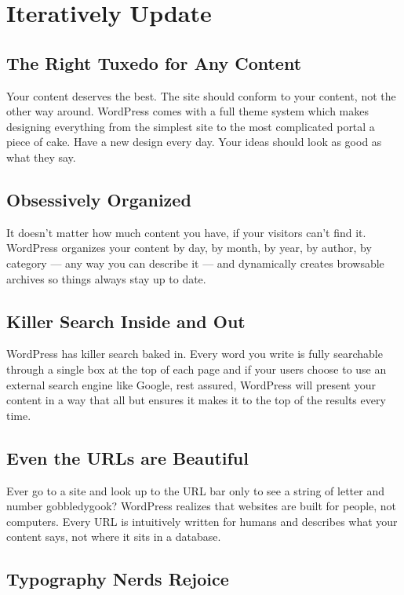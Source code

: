 \section{Iteratively Update}

\subsection{The Right Tuxedo for Any Content}

Your content deserves the best. The site should conform to your content, not the other way around. WordPress comes with a full theme system which makes designing everything from the simplest site to the most complicated portal a piece of cake. Have a new design every day. Your ideas should look as good as what they say.

\subsection{Obsessively Organized}

It doesn’t matter how much content you have, if your visitors can’t find it. WordPress organizes your content by day, by month, by year, by author, by category — any way you can describe it — and dynamically creates browsable archives so things always stay up to date.

\subsection{Killer Search Inside and Out}

WordPress has killer search baked in. Every word you write is fully searchable through a single box at the top of each page and if your users choose to use an external search engine like Google, rest assured, WordPress will present your content in a way that all but ensures it makes it to the top of the results every time.

\subsection{Even the URLs are Beautiful}

Ever go to a site and look up to the URL bar only to see a string of letter and number gobbledygook? WordPress realizes that websites are built for people, not computers. Every URL is intuitively written for humans and describes what your content says, not where it sits in a database.

\subsection{Typography Nerds Rejoice}

